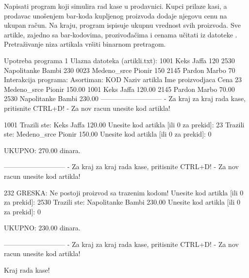 \begin{Answer}[ref=511]
\end{Answer}
\begin{Exercise}[label=512]
  Napisati program koji simulira rad kase u prodavnici. Kupci prilaze
  kasi, a prodavac unošenjem bar-koda kupljenog proizvoda dodaje
  njegovu cenu na ukupan račun. Na kraju, program ispisuje ukupnu
  vrednost svih proizvoda. Sve artikle, zajedno sa bar-kodovima,
  prozivođačima i cenama učitati iz datoteke
  . Pretraživanje niza artikala vršiti binarnom
  pretragom.
  
\begin{maxitest}
\begin{test}{Upotreba programa 1}
Ulazna datoteka (artikli.txt):
  1001 Keks Jaffa 120
  2530 Napolitanke Bambi	230
  0023 Medeno_srce Pionir 150
  2145 Pardon Marbo 70
Interakcija programa:
  Asortiman:
  KOD                Naziv artikla     Ime proizvodjaca       Cena
          23          Medeno_srce               Pionir       150.00
        1001                 Keks                Jaffa       120.00
        2145               Pardon                Marbo        70.00
        2530          Napolitanke                Bambi       230.00
  ---------------------------
  - Za kraj za kraj rada kase, pritisnite CTRL+D!
  - Za nov racun unesite kod artikla!
  
  1001
  	Trazili ste:	Keks Jaffa       120.00
  Unesite kod artikla [ili 0 za prekid]: 	23
  	Trazili ste:	Medeno_srce Pionir       150.00
  Unesite kod artikla [ili 0 za prekid]: 	0
  
  	UKUPNO: 270.00 dinara.
  
  ---------------------------
  - Za kraj za kraj rada kase, pritisnite CTRL+D!
  - Za nov racun unesite kod artikla!
  
  232
  	GRESKA: Ne postoji proizvod sa trazenim kodom!
  Unesite kod artikla [ili 0 za prekid]: 	2530
  	Trazili ste:	Napolitanke Bambi       230.00
  Unesite kod artikla [ili 0 za prekid]: 	0
  
  	UKUPNO: 230.00 dinara.
  
  ---------------------------
  - Za kraj za kraj rada kase, pritisnite CTRL+D!
  - Za nov racun unesite kod artikla!
  
  Kraj rada kase!  
\end{test}
\end{maxitest}
  
\end{Exercise}

